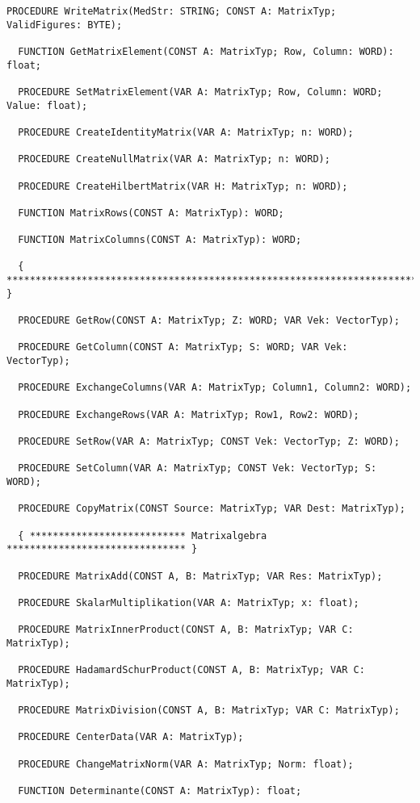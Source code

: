 \begin{refsection}
\begin{lstlisting}[caption=Interface of unit Matrix]
  PROCEDURE WriteMatrix(MedStr: STRING; CONST A: MatrixTyp; ValidFigures: BYTE);

  FUNCTION GetMatrixElement(CONST A: MatrixTyp; Row, Column: WORD): float;

  PROCEDURE SetMatrixElement(VAR A: MatrixTyp; Row, Column: WORD; Value: float);

  PROCEDURE CreateIdentityMatrix(VAR A: MatrixTyp; n: WORD);

  PROCEDURE CreateNullMatrix(VAR A: MatrixTyp; n: WORD);

  PROCEDURE CreateHilbertMatrix(VAR H: MatrixTyp; n: WORD);

  FUNCTION MatrixRows(CONST A: MatrixTyp): WORD;

  FUNCTION MatrixColumns(CONST A: MatrixTyp): WORD;

  { ************************************************************************* }

  PROCEDURE GetRow(CONST A: MatrixTyp; Z: WORD; VAR Vek: VectorTyp);

  PROCEDURE GetColumn(CONST A: MatrixTyp; S: WORD; VAR Vek: VectorTyp);

  PROCEDURE ExchangeColumns(VAR A: MatrixTyp; Column1, Column2: WORD);

  PROCEDURE ExchangeRows(VAR A: MatrixTyp; Row1, Row2: WORD);

  PROCEDURE SetRow(VAR A: MatrixTyp; CONST Vek: VectorTyp; Z: WORD);

  PROCEDURE SetColumn(VAR A: MatrixTyp; CONST Vek: VectorTyp; S: WORD);

  PROCEDURE CopyMatrix(CONST Source: MatrixTyp; VAR Dest: MatrixTyp);

  { *************************** Matrixalgebra ******************************* }

  PROCEDURE MatrixAdd(CONST A, B: MatrixTyp; VAR Res: MatrixTyp);

  PROCEDURE SkalarMultiplikation(VAR A: MatrixTyp; x: float);

  PROCEDURE MatrixInnerProduct(CONST A, B: MatrixTyp; VAR C: MatrixTyp);

  PROCEDURE HadamardSchurProduct(CONST A, B: MatrixTyp; VAR C: MatrixTyp);

  PROCEDURE MatrixDivision(CONST A, B: MatrixTyp; VAR C: MatrixTyp);

  PROCEDURE CenterData(VAR A: MatrixTyp);

  PROCEDURE ChangeMatrixNorm(VAR A: MatrixTyp; Norm: float);

  FUNCTION Determinante(CONST A: MatrixTyp): float;


\end{lstlisting}
\end{refsection}
